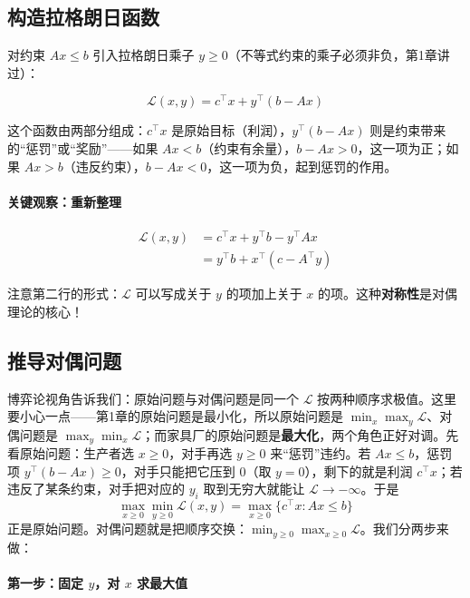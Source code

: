 \subsection{构造拉格朗日函数}

对约束 $Ax \leq b$ 引入拉格朗日乘子 $y \geq 0$（不等式约束的乘子必须非负，第1章讲过）：

\[
\mathcal{L}(x, y) = c^\top x + y^\top(b - Ax)
\]

这个函数由两部分组成：$c^\top x$ 是原始目标（利润），$y^\top(b - Ax)$ 则是约束带来的“惩罚”或“奖励”——如果 $Ax < b$（约束有余量），$b - Ax > 0$，这一项为正；如果 $Ax > b$（违反约束），$b - Ax < 0$，这一项为负，起到惩罚的作用。

\paragraph{关键观察：重新整理}

\begin{align}
\mathcal{L}(x, y) &= c^\top x + y^\top b - y^\top A x \\
&= y^\top b + x^\top(c - A^\top y)
\end{align}

注意第二行的形式：$\mathcal{L}$ 可以写成关于 $y$ 的项加上关于 $x$ 的项。这种\textbf{对称性}是对偶理论的核心！

\subsection{推导对偶问题}

博弈论视角告诉我们：原始问题与对偶问题是同一个 $\mathcal{L}$ 按两种顺序求极值。这里要小心一点——第1章的原始问题是最小化，所以原始问题是 $\min_x \max_y \mathcal{L}$、对偶问题是 $\max_y \min_x \mathcal{L}$；而家具厂的原始问题是\textbf{最大化}，两个角色正好对调。先看原始问题：生产者选 $x \geq 0$，对手再选 $y \geq 0$ 来“惩罚”违约。若 $Ax \leq b$，惩罚项 $y^\top(b - Ax) \geq 0$，对手只能把它压到 $0$（取 $y = 0$），剩下的就是利润 $c^\top x$；若违反了某条约束，对手把对应的 $y_i$ 取到无穷大就能让 $\mathcal{L} \to -\infty$。于是
\[
\max_{x \geq 0} \min_{y \geq 0} \mathcal{L}(x, y) = \max_{x \geq 0} \{ c^\top x : Ax \leq b \}
\]
正是原始问题。对偶问题就是把顺序交换：$\min_{y \geq 0} \max_{x \geq 0} \mathcal{L}$。我们分两步来做：

\paragraph{第一步：固定 $y$，对 $x$ 求最大值}

